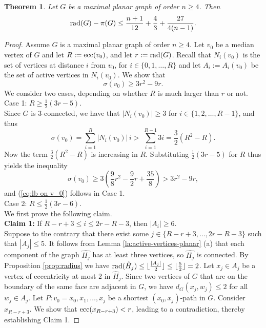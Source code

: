 \documentclass[a4paper,11pt]{article}
\newtheorem{theorem}{Theorem}[section]
\begin{document}
\begin{theorem}\label{theo:rad-vs-pi-in-triangulation}
Let $G$ be a maximal planar graph of order $n \geq 4$. Then
\[{\rm rad}(G)-\pi(G) \leq \frac{n+1}{12}+\frac{4}{3} +\frac{27}{4(n-1)}.\]
\end{theorem}

\begin{proof}
Assume \( G \) is a maximal planar graph of order $n \geq 4$. 
Let $v_0$ be a median vertex of $G$ and let $R := {\rm ecc}(v_0)$, and let $r:= {\rm rad}(G)$. 
Recall that $N_i(v_0)$ is the set of vertices at distance $i$ from $v_0$, for 
$i \in \{0,1,\ldots,R\}$ and let \( A_i:=A_i(v_0) \) be the set of active vertices in 
\( N_i(v_0) \). 
 We show that 
\begin{equation} \label{eq:lb on v_0}
\sigma(v_0) \geq  3r^2-9r.
\end{equation} 
We consider two cases, depending on whether $R$ is much larger than $r$ or not. \\[1mm]
{\sc Case 1:} $R \geq \frac{1}{2}(3r-5)$. \\ 
Since $G$ is $3$-connected, we have that $|N_i(v_0)| \geq 3$ for $i \in \{1,2,\ldots,R-1\}$, and thus
\[
\sigma(v_0) = \sum_{i=1}^{R} |N_i(v_0)| \, i 
     > \; \sum_{i=1}^{R-1} 3i
     =  \frac{3}{2}(R^2-R). \]
Now the term $\frac{3}{2}(R^2-R)$ is increasing in $R$. Substituting $\frac{1}{2}(3r-5)$ for $R$ thus 
yields the inequality 
\[ \sigma(v_0)    
      \geq  3\left(\frac{9}{8}r^2-\frac{9}{2}r+\frac{35}{8}\right) 
       > 3r^2-9r,      \]
and (\ref{eq:lb on v_0}) follows in Case 1. \\[1mm]
{\sc Case 2:} $R \leq \frac{1}{2}(3r-6)$. \\
We first prove the following claim.\\[1mm]
{\bf Claim 1:} If $R-r+3 \leq i \leq 2r-R-3$, then $|A_i| \geq 6$. \\
Suppose to the contrary that there exist some $j \in \{R-r+3,\ldots,2r-R-3\}$ such that 
$|A_j| \leq 5$. 
It follows from Lemma \ref{la:active-vertices-planar} (a) that each component of the graph 
$\hat{H_j}$ has at least three vertices, so $\hat{H_j}$ is connected. 
By Proposition \ref{prop:radius} we have 
${\rm rad}(\hat{H}_j) \leq \lfloor \frac{|A_j|}{2} \rfloor \leq \lfloor \frac{5}{2}\rfloor =2$.
Let $x_j \in A_j$ be a vertex of eccentricity at most $2$ in $\hat{H}_j$.
Since two vertices of $G$ that are on the boundary of the same face are adjacent in $G$, 
we have $d_G(x_j,w_j) \leq 2$ for all $w_j \in A_j$. 
Let $P: v_0=x_0, x_1,\ldots,x_j$ be a shortest 
$(x_0, x_j)$-path in $G$. Consider $x_{R-r+3}$. We show that ${\rm ecc}(x_{R - r + 3}) < r$, 
leading to a contradiction, thereby establishing Claim 1. 


\end{proof}
\end{document}
